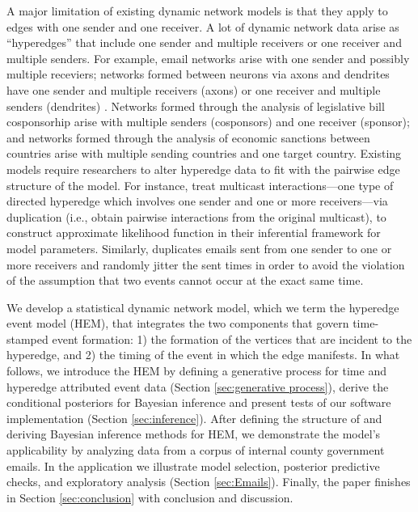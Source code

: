 \documentclass[ba]{imsart}
\numberwithin{equation}{section}
\theoremstyle{plain}
\begin{document}
	A major limitation of existing dynamic network models is that they apply to edges with one sender and one receiver. A lot of dynamic network data arise as ``hyperedges'' \citep{karypis1999multilevel,ghoshal2009random,zlatic2009hypergraph,zhang2010hypergraph} that include one sender and multiple receivers or one receiver and multiple senders. For example, email networks \citep{newman2002email} arise with one sender and possibly multiple receviers;  networks formed between neurons via axons and dendrites have one sender and multiple receivers (axons) or one receiver and multiple senders (dendrites) \citep{partzsch2012developing}. Networks formed through the analysis of legislative bill cosponsorhip \citep{fowler2006legislative} arise with multiple senders (cosponsors) and one receiver (sponsor); and networks formed through the analysis of economic sanctions \citep{cranmer2014reciprocity} between countries arise with multiple sending countries and one target country. Existing models require researchers to alter hyperedge data to fit with the pairwise edge structure of the model. For instance, \cite{PerryWolfe2012} treat multicast interactions---one type of directed hyperedge which involves one sender and one or more receivers---via duplication (i.e., obtain pairwise interactions from the original multicast), to construct approximate likelihood function in their inferential framework for model parameters. Similarly, \cite{fan2009learning} duplicates emails sent from one sender to one or more receivers and randomly jitter the sent times in order to avoid the violation of the assumption that two events cannot occur at the exact same time. %
	
	We develop a statistical dynamic network model, which we term the hyperedge event model (HEM), that integrates the two components that govern time-stamped event formation: 1) the formation of the vertices that are incident to the hyperedge, and 2) the timing of the event in which the edge manifests. In what follows, we introduce the HEM by defining a generative process for time and hyperedge attributed event data (Section \ref{sec:generative process}), derive the conditional posteriors for Bayesian inference and present tests of our software implementation (Section \ref{sec:inference}). After defining the structure of and deriving Bayesian inference methods for HEM, we demonstrate the model's applicability by analyzing data from a corpus of internal county government emails.  In the application we illustrate model selection, posterior predictive checks, and exploratory analysis (Section \ref{sec:Emails}). Finally, the paper finishes in Section \ref{sec:conclusion} with conclusion and discussion.
	
\end{document}
